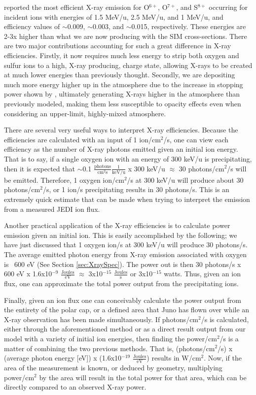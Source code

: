 \documentclass[draft]{agujournal2018}
\begin{document}
\citet{ozak2010} reported the most efficient X-ray emission for O$^{6+}$, O$^{7+}$, and S$^{8+}$ occurring for incident ions with energies of 1.5 MeV/u, 2.5 MeV/u, and 1 MeV/u, and efficiency values of $\sim$0.009, $\sim$0.003, and $\sim$0.015, respectively.
These energies are 2-3x higher than what we are now producing with the SIM cross-sections.
There are two major contributions accounting for such a great difference in X-ray efficiencies.
Firstly, it now requires much less energy to strip both oxygen and sulfur ions to a high, X-ray producing, charge state, allowing X-rays to be created at much lower energies than previously thought.
Secondly, we are depositing much more energy higher up in the atmosphere due to the increase in stopping power shown by \citet{schultz2019}, ultimately generating X-rays higher in the atmosphere than previously modeled, making them less susceptible to opacity effects even when considering an upper-limit, highly-mixed atmosphere.

There are several very useful ways to interpret X-ray efficiencies.
Because the efficiencies are calculated with an input of 1 ion/cm$^2$/s, one can view each efficiency as the number of X-ray photons emitted given an initial ion energy.
That is to say, if a single oxygen ion with an energy of 300 keV/u is precipitating, then it is expected that $\sim$0.1 $\frac{\mathrm{photons}}{\mathrm{cm}^2 \mathrm{s}}\frac{1}{\mathrm{keV/u}}$ x 300 keV/u $\approx$ 30 photons/cm$^2$/s will be emitted.
Therefore, 1 oxygen ion/cm$^2$/s at 300 keV/u will produce about 30 photons/cm$^2$/s, or 1 ion/s precipitating results in 30 photons/s.
This is an extremely quick estimate that can be made when trying to interpret the emission from a measured JEDI ion flux.

Another practical application of the X-ray efficiencies is to calculate power emission given an initial ion.
This is easily accomplished by the following; we have just discussed that 1 oxygen ion/s at 300 keV/u will produce 30 photons/s.
The average emitted photon energy from X-ray emission associated with oxygen is ~600 eV (See Section \ref{sec:XraySpec}).
The power out is then 30 photons/s x 600 eV x 1.6x10$^{-9}$ $\frac{\mathrm{Joules}}{\mathrm{eV}}$ $\approx$ 3x10$^{-15}$ $\frac{\mathrm{Joules}}{\mathrm{s}}$ or 3x10$^{-15}$ watts.
Thus, given an ion flux, one can approximate the total power output from the precipitating ions.

Finally, given an ion flux one can conceivably calculate the power output from the entirety of the polar cap, or a defined area that Juno has flown over while an X-ray observation has been made simultaneously.
If photons/cm$^2$/s is calculated, either through the aforementioned method or as a direct result output from our model with a variety of initial ion energies, then finding the power/cm$^2$/s is a matter of combining the two  previous methods.
That is, (photons/cm$^2$/s) x (average photon energy [eV]) x (1.6x10$^{-19}$ $\frac{\mathrm{Joules}}{\mathrm{eV}}$) results in W/cm$^2$.
Now, if the area of the measurement is known, or deduced by geometry, multiplying power/cm$^2$ by the area will result in the total power for that area, which can be directly compared to an observed X-ray power.
\end{document}
